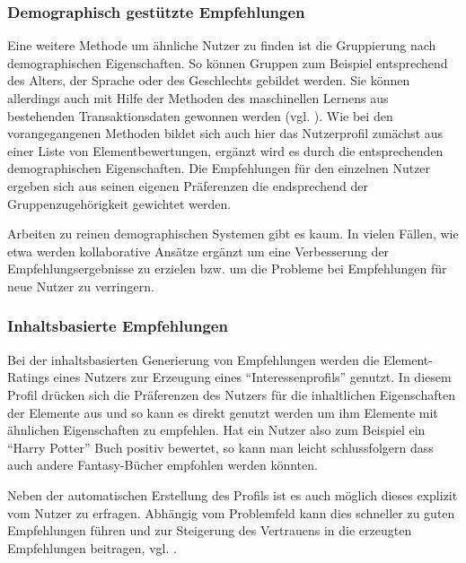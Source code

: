 \subsubsection{Demographisch gestützte Empfehlungen}
Eine weitere Methode um ähnliche Nutzer zu finden ist die Gruppierung nach demographischen Eigenschaften. So können Gruppen zum Beispiel entsprechend des Alters, der Sprache oder des Geschlechts gebildet werden. Sie können allerdings auch mit Hilfe der Methoden des maschinellen Lernens aus bestehenden Transaktionsdaten gewonnen werden (vgl. \citep{Burke:2002:HRS:586321.586352}). Wie bei den vorangegangenen Methoden bildet sich auch hier das Nutzerprofil zunächst aus einer Liste von Elementbewertungen, ergänzt wird es durch die entsprechenden demographischen Eigenschaften. Die Empfehlungen für den einzelnen Nutzer ergeben sich aus seinen eigenen Präferenzen die endsprechend der Gruppenzugehörigkeit gewichtet werden.

Arbeiten zu reinen demographischen Systemen gibt es kaum. In vielen Fällen, wie etwa \citep{Vozalis:2007:USD:1243505.1243639} werden kollaborative Ansätze ergänzt  um eine Verbesserung der Empfehlungsergebnisse zu erzielen bzw. um die Probleme bei Empfehlungen für neue Nutzer zu verringern. \citep{Burke:2002:HRS:586321.586352}

\subsubsection{Inhaltsbasierte Empfehlungen}
Bei der inhaltsbasierten Generierung von Empfehlungen werden die Element-Ratings eines Nutzers zur Erzeugung eines ``Interessenprofils'' genutzt. In diesem Profil drücken sich die Präferenzen des Nutzers für die inhaltlichen Eigenschaften der Elemente aus und so kann es direkt genutzt werden um ihm Elemente mit ähnlichen Eigenschaften zu empfehlen. Hat ein Nutzer also zum Beispiel ein ``Harry Potter'' Buch positiv bewertet, so kann man leicht schlussfolgern dass auch andere Fantasy-Bücher empfohlen werden könnten.

Neben der automatischen Erstellung des Profils ist es auch möglich dieses explizit vom Nutzer zu erfragen. Abhängig vom Problemfeld kann dies schneller zu guten Empfehlungen führen und zur Steigerung des Vertrauens in die erzeugten Empfehlungen beitragen, vgl. \citep{hb_20}.

